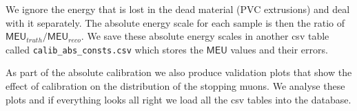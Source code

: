 \documentclass[12pt,a4paper]{article}
\begin{document}
We ignore the energy that is lost in the dead material (PVC extrusions) and deal with it separately. The absolute energy scale for each sample is then the ratio of $\textsf{MEU}_{truth}/\textsf{MEU}_{reco}$. We save these absolute energy scales in another csv table called \texttt{calib\_abs\_consts.csv} which stores the $\textsf{MEU}$ values and their errors.

As part of the absolute calibration we also produce validation plots that show the effect of calibration on the distribution of the stopping muons. We analyse these plots and if everything looks all right we load all the csv tables into the database.

\end{document}
